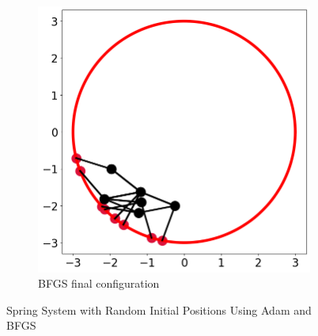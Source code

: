 \documentclass[12pt]{article}
\newcommand{\0}{\boldsymbol{0}}
\begin{document}
\begin{figure}[h!]
\begin{subfigure}[b]{0.3\textwidth}
    \end{subfigure}
    \hfill
    \begin{subfigure}[b]{0.3\textwidth}
        \centering
        \includegraphics[width=\textwidth]{../img/problem_2/bfgs_random.png}
        \caption{BFGS final configuration}
        \label{fig:bfgs_config_random}
    \end{subfigure}
    \label{fig:config_random}
    \caption{Spring System with Random Initial Positions Using Adam and BFGS}
\end{figure}
\end{document}
